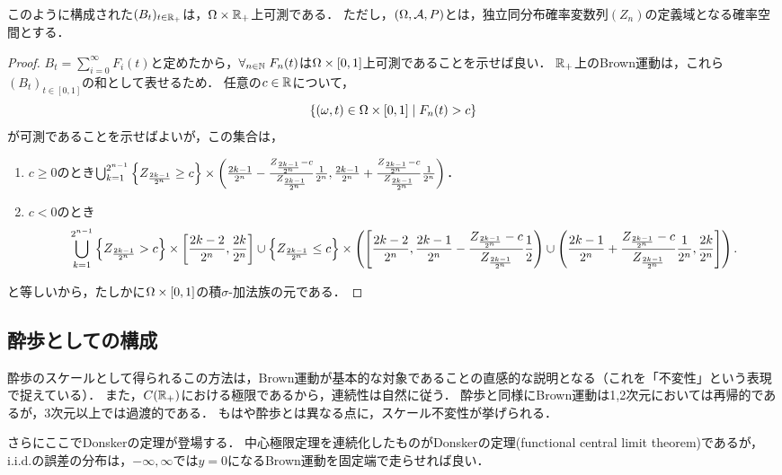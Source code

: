 \documentclass[uplatex,dvipdfmx]{jsreport}
\begin{document}
\begin{proposition}
    このように構成された$(B_t)_{t\in\mathbb{R}_+}$は，$\Omega\times\mathbb{R}_+$上可測である．
    ただし，$(\Omega,\mathcal{A},P)$とは，独立同分布確率変数列$(Z_n)$の定義域となる確率空間とする．
\end{proposition}
\begin{proof}
    $B_t=\sum^\infty_{i=0}F_i(t)$と定めたから，$\forall_{n\in\mathbb{N}}\;F_n(t)$は$\Omega\times[0,1]$上可測であることを示せば良い．
    $\mathbb{R}_+$上のBrown運動は，これら$(B_t)_{t\in[0,1]}$の和として表せるため．
    任意の$c\in\mathbb{R}$について，
    \[\left\{(\omega,t)\in\Omega\times[0,1]\mid F_n(t)>c\right\}\]
    が可測であることを示せばよいが，この集合は，
    \begin{enumerate}
        \item $c\ge0$のとき$\bigcup_{k=1}^{2^{n-1}}\left\{Z_{\frac{2k-1}{2^n}}\ge c\right\}\times\left(\frac{2k-1}{2^n}-\frac{Z_{\frac{2k-1}{2^n}}-c}{Z_{\frac{2k-1}{2^n}}}\frac{1}{2^n},\frac{2k-1}{2^n}+\frac{Z_{\frac{2k-1}{2^n}}-c}{Z_{\frac{2k-1}{2^n}}}\frac{1}{2^n}\right)$．
        \item $c<0$のとき\[\bigcup_{k=1}^{2^{n-1}}\left\{Z_{\frac{2k-1}{2^n}}>c\right\}\times\left[\frac{2k-2}{2^n},\frac{2k}{2^n}\right]\cup\left\{Z_{\frac{2k-1}{2^n}}\le c\right\}\times\left(\left[\frac{2k-2}{2^n},\frac{2k-1}{2^n}-\frac{Z_{\frac{2k-1}{2^n}}-c}{Z_{\frac{2k-1}{2^n}}}\frac{1}{2}\right)\cup\left(\frac{2k-1}{2^n}+\frac{Z_{\frac{2k-1}{2^n}}-c}{Z_{\frac{2k-1}{2^n}}}\frac{1}{2^n},\frac{2k}{2^n}\right]\right).\]
    \end{enumerate}
    と等しいから，たしかに$\Omega\times[0,1]$の積$\sigma$-加法族の元である．
\end{proof}

\subsection{酔歩としての構成}

\begin{tcolorbox}[colframe=ForestGreen, colback=ForestGreen!10!white,breakable,colbacktitle=ForestGreen!40!white,coltitle=black,fonttitle=\bfseries\sffamily,
title=]
    酔歩のスケールとして得られるこの方法は，Brown運動が基本的な対象であることの直感的な説明となる（これを「不変性」という表現で捉えている）．
    また，$C(\mathbb{R}_+)$における極限であるから，連続性は自然に従う．
    酔歩と同様にBrown運動は1,2次元においては再帰的であるが，3次元以上では過渡的である．
    もはや酔歩とは異なる点に，スケール不変性が挙げられる．

    さらにここでDonskerの定理が登場する．
    中心極限定理を連続化したものがDonskerの定理(functional central limit theorem)であるが，i.i.d.の誤差の分布は，$-\infty,\infty$では$y=0$になるBrown運動を固定端で走らせれば良い．
\end{tcolorbox}
\end{document}
